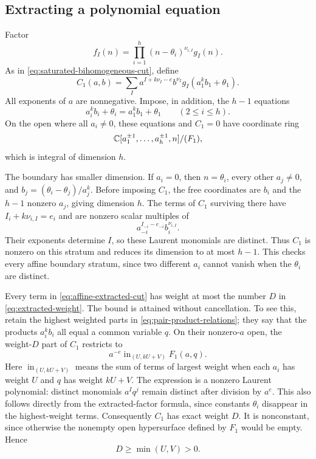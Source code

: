\subsection{Extracting a polynomial equation}

Factor
\[
 f_I(n)=\prod_{i=1}^h(n-\theta_i)^{\nu_{i,I}}g_I(n).
\]
As in \eqref{eq:saturated-bihomogeneous-cut}, define
\begin{equation}
 C_1(a,b)=
 \sum_I a^{I+k\nu_I-e}b^{\nu_I}
 g_I(a_1^kb_1+\theta_1).
 \label{eq:affine-extracted-cut}
\end{equation}
All exponents of \(a\) are nonnegative.  Impose, in addition,
the \(h-1\) equations
\begin{equation}
 a_i^kb_i+\theta_i=a_1^kb_1+\theta_1
 \qquad(2\leq i\leq h).
 \label{eq:pair-product-relations}
\end{equation}
On the open where all \(a_i\ne0\), these equations and \(C_1=0\)
have coordinate ring
\[
 \mathbb C[a_1^{\pm1},\ldots,a_h^{\pm1},n]/(F_1),
\]
which is integral of dimension \(h\).

The boundary has smaller dimension.  If \(a_i=0\), then
\(n=\theta_i\), every other \(a_j\ne0\), and
\(b_j=(\theta_i-\theta_j)/a_j^k\).
Before imposing \(C_1\), the free coordinates are \(b_i\) and the
\(h-1\) nonzero \(a_j\), giving dimension \(h\).
The terms of \(C_1\) surviving there have
\(I_i+k\nu_{i,I}=e_i\) and are nonzero scalar multiples of
\[
 a_{-i}^{I_{-i}-e_{-i}}b_i^{\nu_{i,I}}.
\]
Their exponents determine \(I\), so these Laurent monomials are
distinct.  Thus \(C_1\) is nonzero on this stratum and reduces its
dimension to at most \(h-1\).  This checks every affine boundary
stratum, since two different \(a_i\) cannot vanish when the
\(\theta_i\) are distinct.

Every term in \eqref{eq:affine-extracted-cut} has weight at most
the number \(D\) in \eqref{eq:extracted-weight}.  The bound is
attained without cancellation.  To see this, retain the highest
weighted parts in \eqref{eq:pair-product-relations}; they say
that the products \(a_i^kb_i\) all equal a common variable \(q\).
On their nonzero-\(a\) open, the weight-\(D\) part of \(C_1\)
restricts to
\begin{equation}
 a^{-e}\operatorname{in}_{(U,kU+V)}F_1(a,q).
 \label{eq:nonzero-weighted-top}
\end{equation}
Here \(\operatorname{in}_{(U,kU+V)}\) means the sum of terms of
largest weight when each \(a_i\) has weight \(U\) and \(q\)
has weight \(kU+V\).  The expression is a nonzero Laurent
polynomial: distinct monomials \(a^Iq^j\) remain distinct after
division by \(a^e\).  This also follows directly from the
extracted-factor formula, since constants \(\theta_i\) disappear
in the highest-weight terms.
Consequently \(C_1\) has exact weight \(D\).
It is nonconstant, since otherwise the nonempty open hypersurface
defined by \(F_1\) would be empty.  Hence
\begin{equation}
 D\geq\min(U,V)>0.
 \label{eq:basic-extracted-weight}
\end{equation}

